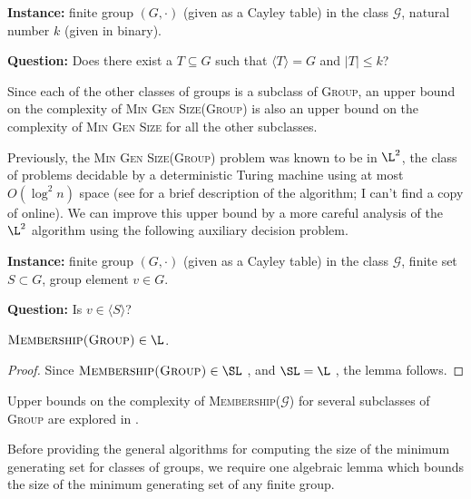 \documentclass{article}
\newcommand{\gen}[1]{{\langle #1 \rangle}}
\begin{document}
\begin{definition}
  \mbox{}

  \textbf{Instance:} finite group $(G, \cdot)$ (given as a Cayley table) in the class $\mathcal{G}$, natural number $k$ (given in binary).

  \textbf{Question:} Does there exist a $T \subseteq G$ such that $\gen{T} = G$ and $|T| \leq k$?
\end{definition}

Since each of the other classes of groups is a subclass of \textsc{Group}, an upper bound on the complexity of \textsc{Min Gen Size(Group)} is also an upper bound on the complexity of \textsc{Min Gen Size} for all the other subclasses.

Previously, the \textsc{Min Gen Size(Group)} problem was known to be in $\L^2$, the class of problems decidable by a deterministic Turing machine using at most $O(\log^2 n)$ space \cite{lsz77} (see \cite[Proposition~3]{at06} for a brief description of the algorithm; I can't find a copy of \cite{lsz77} online).
We can improve this upper bound by a more careful analysis of the $\L^2$ algorithm using the following auxiliary decision problem.

\begin{definition}
  \mbox{}

  \textbf{Instance:} finite group $(G, \cdot)$ (given as a Cayley table) in the class $\mathcal{G}$, finite set $S \subset G$, group element $v \in G$.

  \textbf{Question:} Is $v \in \gen{S}$?
\end{definition}

\begin{lemma}\label{lem:membershipinl}
  $\textsc{Membership(Group)} \in \L$.
\end{lemma}
\begin{proof}
  Since $\textsc{Membership(Group)} \in \SL$ \cite[Section~3]{bm89}, and $\SL = \L$ \cite{reingold08}, the lemma follows.
\end{proof}

Upper bounds on the complexity of \textsc{Membership($\mathcal{G}$)} for several subclasses of \textsc{Group} are explored in \cite{bklm01}.

Before providing the general algorithms for computing the size of the minimum generating set for classes of groups, we require one algebraic lemma which bounds the size of the minimum generating set of any finite group.
\end{document}
